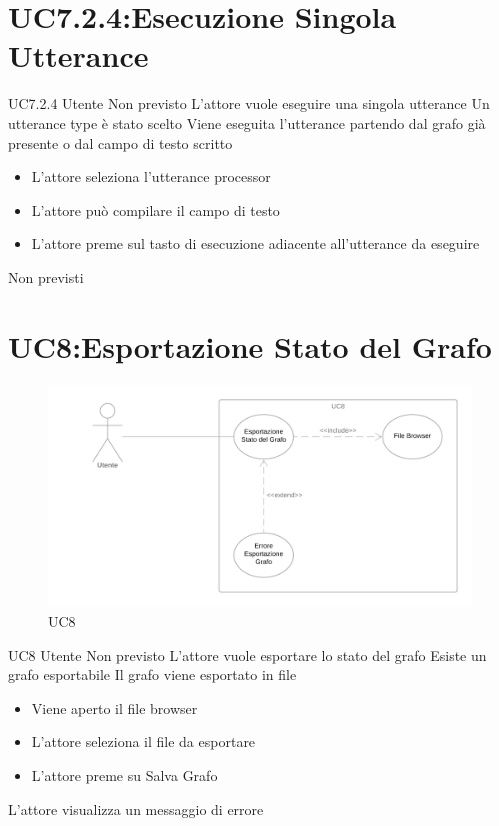 \documentclass[../AnalisideiRequisiti.tex]{subfiles}
\begin{document}
\section{UC7.2.4:Esecuzione Singola Utterance}
\UserCase
{UC7.2.4}
{Utente}
{Non previsto}
{L'attore vuole eseguire una singola utterance}
{Un utterance type è stato scelto  }
{Viene eseguita l'utterance partendo dal grafo già presente o dal campo di testo scritto}
{
	\begin{itemize}
				\item{} L'attore seleziona l'utterance processor
		\item{} L'attore può compilare il campo di testo
		\item{} L'attore preme sul tasto di esecuzione adiacente all'utterance da eseguire 
	\end{itemize}
}
{Non previsti}

\section{UC8:Esportazione Stato del Grafo}
\begin{figure}[H]
	\caption{UC8}
	\centering
	\includegraphics[width=\textwidth]{../img/UC08.png}
\end{figure}
\UserCase
{UC8}
{Utente}
{Non previsto}
{L'attore vuole esportare lo stato del grafo}
{Esiste un grafo esportabile}
{Il grafo viene esportato in file}
{
	\begin{itemize}
			\item{} Viene aperto il file browser 
			\item{} L'attore seleziona il file da esportare 
			\item{} L'attore preme su Salva Grafo
	\end{itemize}
}
{L'attore visualizza un messaggio di errore }
\end{document}
